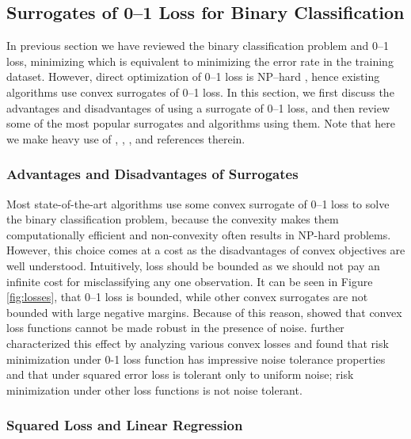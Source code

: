 \subsection{Surrogates of 0--1 Loss for Binary Classification}
\label{sec:bgr.surrogates}

In previous section we have reviewed the binary classification problem and 0--1 loss, minimizing which is equivalent to minimizing the error rate in the training dataset. However, direct optimization of 0--1 loss is NP--hard \cite{Feldman,nphard}, hence existing algorithms use convex surrogates of 0--1 loss. In this section, we first discuss the advantages and disadvantages of using a surrogate of 0--1 loss, and then review some of the most popular  surrogates and algorithms using them. Note that here we make heavy use of \cite{McAllester}, \cite{Webers}, \cite{bishop06}, and references therein.


\subsubsection{Advantages and Disadvantages of Surrogates}
\label{ssec:disadvantages}

Most state-of-the-art algorithms use some convex surrogate of 0--1 loss to solve the binary classification problem, because the convexity makes them computationally efficient \cite{Bartlett} and non-convexity often results in NP-hard problems. However, this choice comes at a cost as the disadvantages of convex objectives are well understood. Intuitively, loss should be bounded as we should not pay an infinite cost for misclassifying any one observation. It can be seen in Figure \ref{fig:losses}, that 0--1 loss is bounded, while other convex surrogates are not bounded with large negative margins. Because of this reason, \cite{outliers} showed that convex loss functions cannot be made robust in the presence of  noise. \cite{outliers2} further characterized this effect by analyzing various convex losses and found that risk minimization under 0-1 loss function has impressive noise tolerance properties and that under squared error loss is tolerant only to uniform noise; risk minimization under other loss functions is not noise tolerant.

\subsubsection{Squared Loss and Linear Regression}

